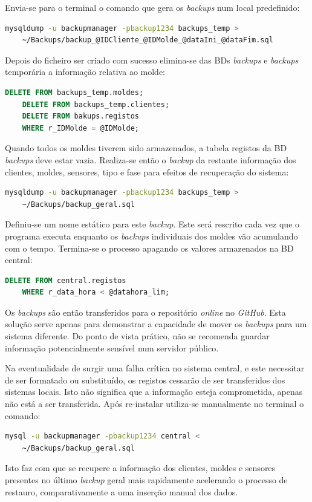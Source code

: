 \documentclass[11pt,twoside,a4paper]{report}
\begin{document}
Envia-se para o terminal o comando que gera os \textit{backups} num local predefinido:
\begin{lstlisting}[language = bash]
	mysqldump -u backupmanager -pbackup1234 backups_temp >
	~/Backups/backup_@IDCliente_@IDMolde_@dataIni_@dataFim.sql
\end{lstlisting}
Depois do ficheiro ser criado com sucesso elimina-se das BDs \textit{backups} e \textit{backups} temporária a informação relativa ao molde:
\begin{lstlisting}[language = SQL]
	DELETE FROM backups_temp.moldes;
	DELETE FROM backups_temp.clientes;
	DELETE FROM bakups.registos
	WHERE r_IDMolde = @IDMolde;
\end{lstlisting}
Quando todos os moldes tiverem sido armazenados, a tabela registos da BD \textit{backups} deve estar vazia. Realiza-se então o \textit{backup} da restante informação dos clientes, moldes, sensores, tipo e fase para efeitos de recuperação do sistema:
\begin{lstlisting}[language = bash]
	mysqldump -u backupmanager -pbackup1234 backups_temp >
	~/Backups/backup_geral.sql
\end{lstlisting}
Definiu-se um nome estático para este \textit{backup}. Este será rescrito cada vez que o programa executa enquanto os \textit{backups} individuais dos moldes vão acumulando com o tempo. Termina-se o processo apagando os valores armazenados na BD central:
\begin{lstlisting}[language = SQL]
	DELETE FROM central.registos
	WHERE r_data_hora < @datahora_lim;
\end{lstlisting}
Os \textit{backups} são então transferidos para o repositório \textit{online} no \textit{GitHub}. Esta solução serve apenas para demonstrar a capacidade de mover os \textit{backups} para um sistema diferente. Do ponto de vista prático, não se recomenda guardar informação potencialmente sensível num servidor público.\par 
Na eventualidade de surgir uma falha crítica no sistema central, e este necessitar de ser formatado ou substituído, os registos cessarão de ser transferidos dos sistemas locais. Isto não significa que a informação esteja comprometida, apenas não está a ser transferida. Após re-instalar utiliza-se manualmente no terminal o comando:
\begin{lstlisting}[language = bash]
	mysql -u backupmanager -pbackup1234 central <
	~/Backups/backup_geral.sql
\end{lstlisting}
Isto faz com que se recupere a informação dos clientes, moldes e sensores presentes no último \textit{backup} geral mais rapidamente acelerando o processo de restauro, comparativamente a uma inserção manual dos dados.\par 
\end{document}
